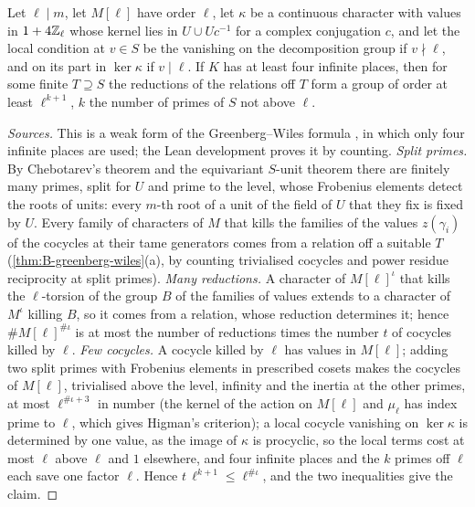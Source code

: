 \begin{theorem}\label{thm:B-relations-mod-l}
Let $\ell\mid m$, let $M[\ell]$ have order $\ell$, let $\kappa$ be a continuous character with values in $1+4\mathbb{Z}_\ell$ whose kernel lies in $U\cup Uc^{-1}$ for a complex conjugation $c$, and let the local condition at $v\in S$ be the vanishing on
the decomposition group if $v\nmid\ell$, and on its part in $\ker\kappa$ if $v\mid\ell$. If $K$ has at least four infinite places, then for some finite $T\supseteq S$ the reductions of the relations off $T$ form a group of order at least
$\ell^{k+1}$, $k$ the number of primes of $S$ not above $\ell$.
\end{theorem}

\begin{proof}[Sources]
This is a weak form of the Greenberg--Wiles formula \cite{Greenberg1989,Wiles1990}, in which only four infinite places are used; the Lean development proves it by counting. \emph{Split primes.} By Chebotarev's theorem and the equivariant
$S$-unit theorem there are finitely many primes, split for $U$ and prime to the level, whose Frobenius elements detect the roots of units: every $m$-th root of a unit of the field of $U$ that they fix is fixed by $U$. Every family of
characters of $M$ that kills the families of the values $z(\gamma_i)$ of the cocycles at their tame generators comes from a relation off a suitable $T$ (\cref{thm:B-greenberg-wiles}(a), by counting trivialised cocycles and power residue
reciprocity at split primes). \emph{Many reductions.} A character of $M[\ell]^\iota$ that kills the $\ell$-torsion of the group $B$ of the families of values extends to a character of $M^\iota$ killing $B$, so it comes from a relation, whose
reduction determines it; hence $\#M[\ell]^{\#\iota}$ is at most the number of reductions times the number $t$ of cocycles killed by $\ell$. \emph{Few cocycles.} A cocycle killed by $\ell$ has values in $M[\ell]$; adding two split primes with
Frobenius elements in prescribed cosets makes the cocycles of $M[\ell]$, trivialised above the level, infinity and the inertia at the other primes, at most $\ell^{\#\iota+3}$ in number (the kernel of the action on $M[\ell]$ and
$\mu_\ell$ has index prime to $\ell$, which gives Higman's criterion); a local cocycle vanishing on $\ker\kappa$ is determined by one value, as the image of $\kappa$ is procyclic, so the local terms cost at most $\ell$ above $\ell$ and $1$
elsewhere, and four infinite places and the $k$ primes off $\ell$ each save one factor $\ell$. Hence $t\,\ell^{k+1}\le\ell^{\#\iota}$, and the two inequalities give the claim.
\end{proof}

